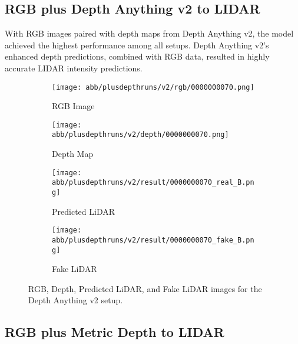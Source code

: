 \subsection{RGB plus Depth Anything v2 to LIDAR}
With RGB images paired with depth maps from Depth Anything v2, the model achieved the highest performance among all setups. Depth Anything v2’s enhanced depth predictions, combined with RGB data, resulted in highly accurate LIDAR intensity predictions.
\begin{figure}[!ht]
	\centering
	\begin{subfigure}{0.4\textwidth}
		\centering
		\texttt{[image: abb/plusdepthruns/v2/rgb/0000000070.png]}
		\caption{RGB Image}
		\label{fig:v2_rgb}
	\end{subfigure}
	
	\vspace{1em} %
	
	\begin{subfigure}{0.4\textwidth}
		\centering
		\texttt{[image: abb/plusdepthruns/v2/depth/0000000070.png]}
		\caption{Depth Map}
		\label{fig:v2_depth}
	\end{subfigure}
	
	\vspace{1em} %
	
	\begin{subfigure}{0.25\textwidth}
		\centering
		\texttt{[image: abb/plusdepthruns/v2/result/0000000070\_real\_B.png]}
		\caption{Predicted LiDAR}
		\label{fig:v2_pred_lidar}
	\end{subfigure}
	\begin{subfigure}{0.25\textwidth}
		\centering
		\texttt{[image: abb/plusdepthruns/v2/result/0000000070\_fake\_B.png]}
		\caption{Fake LiDAR}
		\label{fig:v2_fake_lidar}
	\end{subfigure}
	
	\caption{RGB, Depth, Predicted LiDAR, and Fake LiDAR images for the Depth Anything v2 setup.}
	\label{fig:v2plusdepth}
\end{figure}
\subsection{RGB plus Metric Depth to LIDAR}

